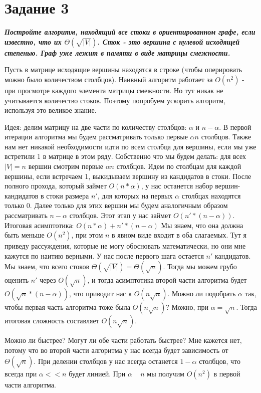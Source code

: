 \documentclass{article}
\begin{document}
\bigskip


\section*{\textbf{Задание 3}} \textbf{\textit{Постройте алгоритм, находящий все стоки в ориентированном графе, если известно, что их $\Theta(\sqrt{|V|})$. Сток - это вершина с нулевой исходящей степенью. Граф уже лежит в памяти в виде матрицы смежности.}}

Пусть в матрице исходящие вершины находятся в строке (чтобы оперировать можно было количеством столбцов). 
Наивный алгоритм работает за $O(n^2)$ - при просмотре каждого элемента матрицы смежности.
Но тут никак не учитывается количество стоков. Поэтому попробуем ускорить алгоритм, используя это великое знание.

Идея: делим матрицу на две части по количеству столбцов: $\alpha$ и $n-\alpha$. В первой итерации алгоритма мы будем рассматривать только первые $\alpha n$ столбцов. Также нам нет никакой необходимости идти по всем столбца для вершины, если мы уже встретили 1 в матрице в этом ряду. 
Собственно что мы будем делать: для всех $|V|=n$ вершин смотрим первые $\alpha n$ столбцов. Идем по столбцам для каждой вершины, если встречаем 1, выкидываем вершину из кандидатов в стоки. 
После полного прохода, который займет $O(n * \alpha)$, у нас останется набор вершин-кандидатов в стоки размера $n'$, для которых на первых $\alpha$ столбцах находятся только 0. 
Далее только для этих вершин мы будем аналогичным образом рассматривать $n - \alpha$ столбцов. Этот этап у нас займет $O(n' * (n-\alpha))$. 
Итоговая асимптотика: $O(n * \alpha) + n' * (n-\alpha)$
Мы знаем, что она должна быть меньше $O(n^2)$, при этом $n$ в явном виде входит в оба слагаемых. Тут я приведу рассуждения, которые не могу обосновать математически, но они мне кажутся по наитию верными.
У нас после первого шага остается $n'$ кандидатов. Мы знаем, что всего стоков $\Theta(\sqrt{|V|}) = \Theta(\sqrt{n})$. Тогда мы можем грубо оценить $n'$ через $O(\sqrt{n})$, и тогда асимптотика второй части алгоритма будет $O(\sqrt{n} * (n-\alpha))$, что приводит нас к $O(n\sqrt{n})$. Можно ли подобрать $\alpha$ так, чтобы первая часть алгоритма тоже была $O(n\sqrt{n})$? Можно, при $\alpha = \sqrt{n}$. Тогда итоговая сложность составляет $O(n\sqrt{n})$.

Можно ли быстрее? Могут ли обе части работать быстрее? Мне кажется нет, потому что во второй части алгоритма у нас всегда будет зависимость от $\Theta(\sqrt{n})$. При делении столбцов у нас всегда останется $1 - \alpha$ столбцов, что всегда при $\alpha << n$ будет линией. При $\alpha$ ~ $n$ мы получим $O(n^2)$ в первой части алгоритма. 

\bigskip
\end{document}
